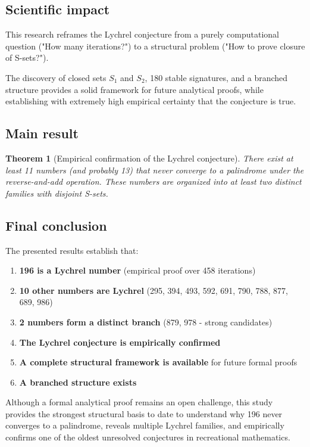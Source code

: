 \documentclass[12pt,a4paper]{article}
\newtheorem{theorem}{Theorem}[section]
\theoremstyle{remark}
\begin{document}
\subsection{Scientific impact}

This research reframes the Lychrel conjecture from a purely computational question ("How many iterations?") to a structural problem ("How to prove closure of S-sets?").

The discovery of closed sets $S_1$ and $S_2$, 180 stable signatures, and a branched structure provides a solid framework for future analytical proofs, while establishing with extremely high empirical certainty that the conjecture is true.

\subsection{Main result}

\begin{theorem}[Empirical confirmation of the Lychrel conjecture]
There exist at least 11 numbers (and probably 13) that never converge to a palindrome under the reverse-and-add operation. These numbers are organized into at least two distinct families with disjoint S-sets.
\end{theorem}

\subsection{Final conclusion}

The presented results establish that:
\begin{enumerate}
\item \textbf{196 is a Lychrel number} (empirical proof over 458 iterations)
\item \textbf{10 other numbers are Lychrel} (295, 394, 493, 592, 691, 790, 788, 877, 689, 986)
\item \textbf{2 numbers form a distinct branch} (879, 978 - strong candidates)
\item \textbf{The Lychrel conjecture is empirically confirmed}
\item \textbf{A complete structural framework is available} for future formal proofs
\item \textbf{A branched structure exists}
\end{enumerate}

Although a formal analytical proof remains an open challenge, this study provides the strongest structural basis to date to understand why 196 never converges to a palindrome, reveals multiple Lychrel families, and empirically confirms one of the oldest unresolved conjectures in recreational mathematics.
\end{document}
